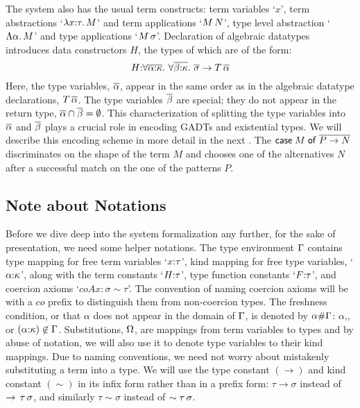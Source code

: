 \documentclass[screen,nonacm,manuscript,review]{acmart} %
\begin{document}
The system also has the usual term constructs: term variables `$x$',
term abstractions `$\lambda x{:}\tau.\, M$' and term applications `$M \, N$',
type level abstraction `$\Lambda \alpha.\, M$' and type applications
`$M\,\sigma$'. Declaration of algebraic datatypes introduces data
constructors $H$, the types of which are of the form:
\[
H {:} \forall\overline{\alpha{:}\kappa}.~\forall\overline{\beta{:}\kappa}.~\overline{\sigma} \to T\,\overline{\alpha}
\]
Here, the type variables, $\overline{\alpha}$, appear in the same order as in
the algebraic datatype declarations, $T\,\overline{\alpha}$.
The type variables $\overline{\beta}$ are special; they
do not appear in the return type, $\overline{\alpha} \cap \overline{\beta} = \emptyset$. This
characterization of splitting the type variables into $\overline{\alpha}$
and $\overline{\beta}$ plays a crucial role in encoding GADTs and
existential types. We will describe this encoding scheme in more
detail in the next .
The $\mathsf{case}\;M\;\mathsf{of}\;\overline{P \to N}$
discriminates on the shape of the term $M$ and chooses one of the
alternatives $N$ after a successful match on the one of the patterns
$P$.



\subsection{Note about Notations}\label{sec:notations}
Before we dive deep into the system formalization any further, for the
sake of presentation, we need
some helper notations.
The type environment $\Gamma$ contains type mapping for free term variables
`$x{:}\tau$', kind mapping for free type variables,
`$\alpha{:}\kappa$', along with the term constants `$H{:}\tau$', type
function constants `$F{:} \tau$', and coercion axioms
`$coAx:\sigma\sim\tau$'. The convention of naming
coercion axioms will be with a $co$ prefix to distinguish them from
non-coercion types. The freshness condition, or that $\alpha$ does not appear in the
domain of $\Gamma$, is denoted by $\alpha \# \Gamma$: $\alpha$,, or
$(\alpha{:}\kappa) \not\in \Gamma$. Substitutions, $\Omega$, are mappings from term variables to
types and by abuse of notation, we will also use it to denote type
variables to their kind mappings. Due to naming conventions, we need
not worry about mistakenly substituting a term into a type. We will
use the type constant $(\to)$ and kind constant $(\sim)$ in its infix
form rather than in a prefix form: $\tau \to \sigma$ instead of
$\to \,\tau\,\sigma$, and similarly $\tau\sim\sigma$ instead of
$\sim \tau\,\sigma$.
\end{document}
